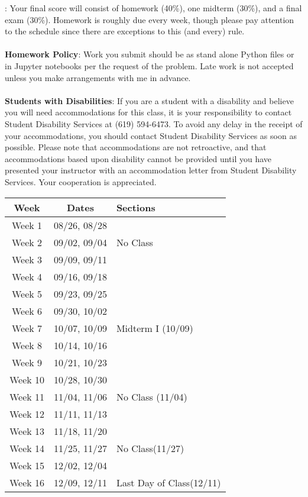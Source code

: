 \documentclass[a4paper,11pt]{article}
\begin{document}
: Your final score will consist of homework (40\%), one midterm (30\%), and a final exam (30\%).  Homework is roughly due every  week, though please pay attention to the schedule since there are exceptions to this (and every) rule.  \\
\\
{\bf Homework Policy}:  Work you submit should be as stand alone Python files or in Jupyter notebooks per the request of the problem.  Late work is not accepted unless you make arrangements with me in advance.\\  
\\
{\bf Students with Disabilities}: If you are a student with a disability and believe you will need accommodations for this class, it is your responsibility to contact Student Disability Services at (619) 594-6473. To avoid any delay in the receipt of your accommodations, you should contact Student Disability Services as soon as possible. Please note that accommodations are not retroactive, and that accommodations based upon disability cannot be provided until you have presented your instructor with an accommodation letter from Student Disability Services. Your cooperation is appreciated.\\
\pagebreak
\begin{center}
\begin{tabular}[]{cc|l}
Week & Dates & Sections \\
\hline
Week 1 & 08/26, 08/28 & \\
Week 2 & 09/02, 09/04 & No Class\\
Week 3 & 09/09, 09/11 & \\
Week 4 & 09/16, 09/18 & \\
Week 5 & 09/23, 09/25 & \\
Week 6 & 09/30, 10/02 & \\
Week 7 & 10/07, 10/09 & Midterm I (10/09)\\
Week 8 & 10/14, 10/16 & \\
Week 9 & 10/21, 10/23 & \\
Week 10 & 10/28, 10/30 & \\
Week 11 & 11/04, 11/06 & No Class (11/04)\\
Week 12 & 11/11, 11/13 & \\
Week 13 & 11/18, 11/20 & \\
Week 14 & 11/25, 11/27 & No Class(11/27)\\
Week 15 & 12/02, 12/04 & \\
Week 16 & 12/09, 12/11 & Last Day of Class(12/11)\\
\end{tabular}
\end{center}
\end{document}
